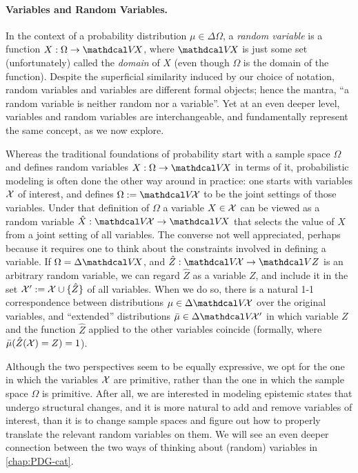 \paragraph{Variables and Random Variables.}
    \label{sec:var-randomvar}
In the context of a probability distribution $\mu \in \Delta \Omega$,
a \emph{random variable} is a function $X : \Omega \to \V\!X$, where $\V\! X$ is just some set (unfortunately) called the \emph{domain} of $X$
    (even though $\Omega$ is the domain of the function).
Despite the superficial similarity induced by our choice of notation, random variables and variables are different formal objects;
    hence the mantra, 
    ``a random variable is neither random nor a variable''. 
Yet at an even deeper level, variables and random variables are interchangeable, and fundamentally represent the same concept, as we now explore. 

Whereas the traditional foundations of probability start with a sample space $\Omega$ and defines random variables $X : \Omega \to \V\!X$ in terms of it, 
probabilistic modeling is often done the other way around in practice: one starts with variables $\mathcal X$ of interest, and defines $\Omega := \V\!\X$ to be the joint settings of those variables. 
Under that definition of $\Omega$ a variable $X \in \mathcal X$ can be viewed as a random variable $\hat X : \V\!\X \to \V\!X$ that selects the value of $X$ from a joint setting of all variables.  
The converse not well appreciated, 
    perhaps because it requires one to think about
    the constraints involved in defining a variable.
If $\Omega = \Delta \V\!X$, and  
    $\hat Z : \V\!\X \to \V Z$
    is an arbitrary random variable, 
    we can regard $\hat Z$ as a variable $Z$, and include it in the set $\mathcal X' := \mathcal X \cup \{ \hat Z \}$ of all variables.
When we do so,  
there is a natural 1-1 correspondence between distributions $\mu \in \Delta \V\!\X$ over the original variables, and ``extended'' distributions 
$\bar\mu \in \Delta \V\!\X'$ in which variable $Z$ and the function $\hat Z$ applied to the other variables coincide (formally, where $\bar\mu(\hat Z(\mathcal X) = Z)=1$).

%
Although the two perspectives seem to be equally expressive, we opt for the one in which the variables $\mathcal X$ are primitive, rather than the one in which the sample space $\Omega$ is primitive. 
After all, we are interested in modeling epistemic states that undergo structural changes, and it is more natural to add and remove variables of interest, than it is to change sample spaces and figure out how to properly translate the relevant random variables on them.  
We will see an even deeper connection between the two ways of thinking about (random) variables in \cref{chap:PDG-cat}.

